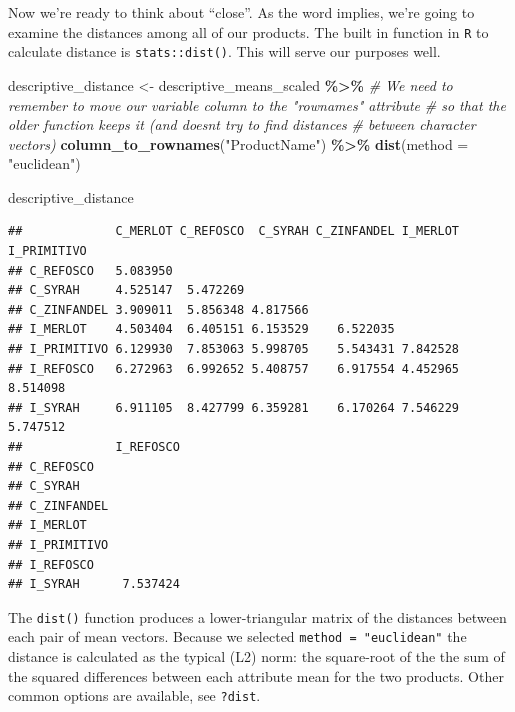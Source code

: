 \documentclass[
]{book}
\newenvironment{Shaded}{\begin{snugshade}}{\end{snugshade}}
\newcommand{\AttributeTok}[1]{\textcolor[rgb]{0.13,0.29,0.53}{#1}}
\newcommand{\CommentTok}[1]{\textcolor[rgb]{0.56,0.35,0.01}{\textit{#1}}}
\newcommand{\FunctionTok}[1]{\textcolor[rgb]{0.13,0.29,0.53}{\textbf{#1}}}
\newcommand{\NormalTok}[1]{#1}
\newcommand{\OtherTok}[1]{\textcolor[rgb]{0.56,0.35,0.01}{#1}}
\newcommand{\SpecialCharTok}[1]{\textcolor[rgb]{0.81,0.36,0.00}{\textbf{#1}}}
\newcommand{\StringTok}[1]{\textcolor[rgb]{0.31,0.60,0.02}{#1}}
\begin{document}
Now we're ready to think about ``close''. As the word implies, we're going to examine the distances among all of our products. The built in function in \texttt{R} to calculate distance is \texttt{stats::dist()}. This will serve our purposes well.

\begin{Shaded}
\begin{Highlighting}[]
\NormalTok{descriptive\_distance }\OtherTok{\textless{}{-}} 
\NormalTok{  descriptive\_means\_scaled }\SpecialCharTok{\%\textgreater{}\%}
  \CommentTok{\# We need to remember to move our variable column to the "rownames" attribute}
  \CommentTok{\# so that the older function keeps it (and doesn\textquotesingle{}t try to find distances}
  \CommentTok{\# between character vectors)}
  \FunctionTok{column\_to\_rownames}\NormalTok{(}\StringTok{"ProductName"}\NormalTok{) }\SpecialCharTok{\%\textgreater{}\%}
  \FunctionTok{dist}\NormalTok{(}\AttributeTok{method =} \StringTok{"euclidean"}\NormalTok{)}

\NormalTok{descriptive\_distance}
\end{Highlighting}
\end{Shaded}

\begin{verbatim}
##             C_MERLOT C_REFOSCO  C_SYRAH C_ZINFANDEL I_MERLOT I_PRIMITIVO
## C_REFOSCO   5.083950                                                    
## C_SYRAH     4.525147  5.472269                                          
## C_ZINFANDEL 3.909011  5.856348 4.817566                                 
## I_MERLOT    4.503404  6.405151 6.153529    6.522035                     
## I_PRIMITIVO 6.129930  7.853063 5.998705    5.543431 7.842528            
## I_REFOSCO   6.272963  6.992652 5.408757    6.917554 4.452965    8.514098
## I_SYRAH     6.911105  8.427799 6.359281    6.170264 7.546229    5.747512
##             I_REFOSCO
## C_REFOSCO            
## C_SYRAH              
## C_ZINFANDEL          
## I_MERLOT             
## I_PRIMITIVO          
## I_REFOSCO            
## I_SYRAH      7.537424
\end{verbatim}

The \texttt{dist()} function produces a lower-triangular matrix of the distances between each pair of mean vectors. Because we selected \texttt{method\ =\ "euclidean"} the distance is calculated as the typical (L2) norm: the square-root of the the sum of the squared differences between each attribute mean for the two products. Other common options are available, see \texttt{?dist}.
\end{document}

